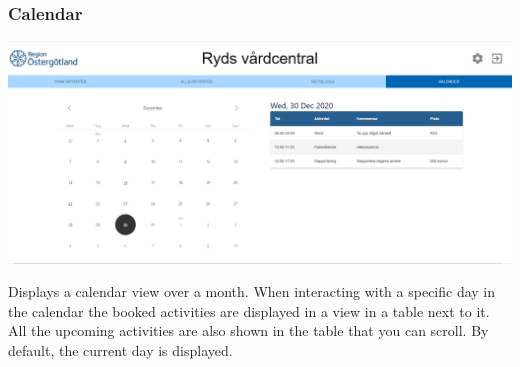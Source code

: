 \subsubsection{Calendar}
\begin{center}
    \includegraphics[width=\linewidth]{images/Calender_overview_patient.png}
    \label{fig:figures}
\end{center}
Displays a calendar view over a month. When interacting with a specific day in the calendar the booked activities are displayed in a view in a table next to it. All the upcoming activities are also shown in the table that you can scroll. By default, the current day is displayed.
\\
